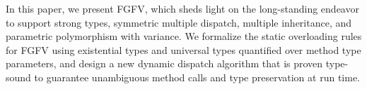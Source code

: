 In this paper, we present FGFV, which sheds light on the long-standing
endeavor to support strong types, symmetric multiple dispatch, multiple inheritance,
and parametric polymorphism with variance.
We formalize the static overloading rules for FGFV using
existential types and universal types quantified over method type
parameters, and design a new dynamic dispatch algorithm that is proven
type-sound to guarantee unambiguous method calls and type preservation
at run time.


